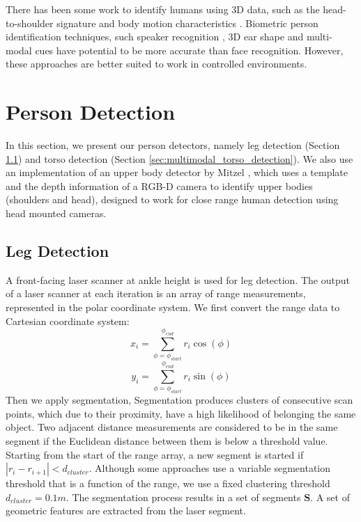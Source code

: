 There has been some work to identify humans using 3D data, such as the head-to-shoulder signature \cite{kirchner2012head} and body motion characteristics \cite{munsell2012person}. Biometric person identification techniques, such speaker recognition \cite{kinnunen2010overview}, 3D ear shape \cite{yan2007biometric} and multi-modal cues \cite{garcia2003biomet} have potential to be more accurate than face recognition. However, these approaches are better suited to work in controlled environments.

\section{Person Detection}
\label{sec:multimodal_person_detection}

In this section, we present our person detectors, namely leg detection (Section \ref{sec:multimodal_leg_detection}) and torso detection (Section \ref{sec:multimodal_torso_detection}). We also use an implementation of an upper body detector by Mitzel \cite{mitzel2012close}, which uses a template and the depth information of a RGB-D camera to identify upper bodies (shoulders and head), designed to work for close range human detection using head mounted cameras.

\subsection{Leg Detection}
\label{sec:multimodal_leg_detection}

A front-facing laser scanner at ankle height is used for leg detection. The output of a laser scanner at each iteration is an array of range measurements, represented in the polar coordinate system. We first convert the range data to Cartesian coordinate system:
\[
x_{i} = \sum_{\phi = \phi_{start}}^{\phi_{end}} r_i\cos(\phi)
\]
\[
y_{i} = \sum_{\phi = \phi_{start}}^{\phi_{end}} r_i\sin(\phi)
\]
Then we apply segmentation, Segmentation produces clusters of consecutive scan points, which due to their proximity, have a high likelihood of belonging the same object. Two adjacent distance measurements are considered to be in the same segment if the Euclidean distance between them is below a threshold value. Starting from the start of the range array, a new segment is started if $|r_{i}-r_{i+1}|<d_{cluster}$. Although some approaches use a variable segmentation threshold that is a function of the range, we use a fixed clustering threshold $d_{cluster}=0.1m$. The segmentation process results in a set of segments $\mathbf{S}$. A set of geometric features are extracted from the laser segment.

